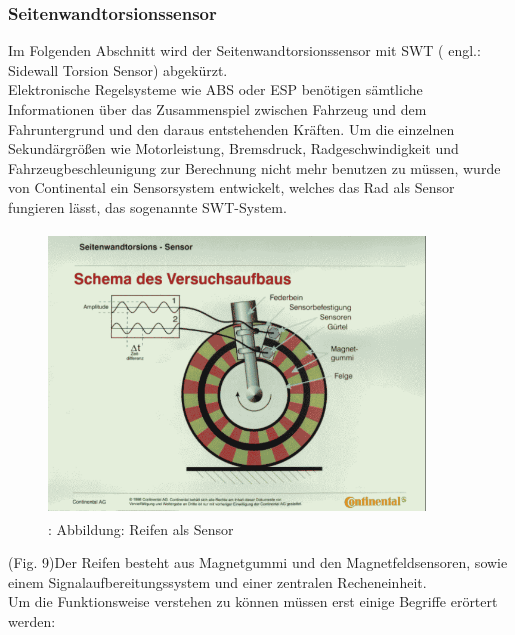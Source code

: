 			\subsubsection{Seitenwandtorsionssensor}
				Im Folgenden Abschnitt wird der Seitenwandtorsionssensor mit SWT ( engl.: Sidewall Torsion Sensor) abgekürzt.\\ 
				Elektronische Regelsysteme wie ABS oder ESP benötigen sämtliche Informationen über das Zusammenspiel zwischen Fahrzeug und dem Fahruntergrund und den daraus entstehenden Kräften. Um die einzelnen Sekundärgrößen wie Motorleistung, Bremsdruck, Radgeschwindigkeit und Fahrzeugbeschleunigung zur Berechnung nicht mehr benutzen zu müssen, wurde von Continental ein Sensorsystem entwickelt, welches das Rad als Sensor fungieren lässt, das sogenannte SWT-System. 
				
				\begin{figure}
					\centering
					\includegraphics[width=10cm, height=7.5cm] {swt1.png}
					\caption {\cite{TS17}: Abbildung: Reifen als Sensor}
				\end{figure}
			
				(Fig. 9)Der Reifen besteht aus Magnetgummi und den Magnetfeldsensoren, sowie einem Signalaufbereitungssystem und einer zentralen Recheneinheit.\\
				Um die Funktionsweise verstehen zu können müssen erst einige Begriffe erörtert werden:
				
